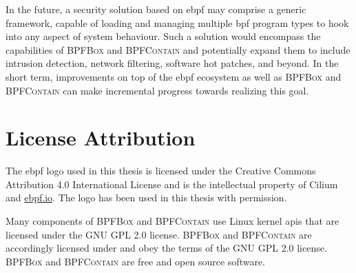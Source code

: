 \documentclass[
  fontsize=12pt,
  titlepage=firstiscover,
  paper=letter,
oneside,
  cleardoublepage=plain,
  parskip=half-,
  DIV=10,
  parindent,
  appendixprefix,
  chapterprefix,
  listof=totoc,
]{scrbook}
\newcommand{\bpfbox}{\textsc{BPFBox}}
\newcommand{\bpfcontain}{\textsc{BPFContain}}
\begin{document}
In the future, a security solution based on \gls{ebpf} may comprise a generic framework,
capable of loading and managing multiple \gls{bpf} program types to hook into any aspect
of system behaviour. Such a solution would encompass the capabilities of \bpfbox{} and
\bpfcontain{} and potentially expand them to include intrusion detection, network
filtering, software hot patches, and beyond. In the short term, improvements on top of the
\gls{ebpf} ecosystem as well as \bpfbox{} and \bpfcontain{} can make incremental progress
towards realizing this goal.



\cleardoublepage \printbibliography[heading=bibintoc]

\appendix \printglossary[type=\acronymtype, title=List of Acronyms, toctitle=List of Acronyms]

\chapter{License Attribution}

The \gls{ebpf} logo used in this thesis is licensed under the Creative Commons Attribution
4.0 International License and is the intellectual property of Cilium and \url{ebpf.io}.
The logo has been used in this thesis with permission.

Many components of \bpfbox{} and \bpfcontain{} use Linux kernel \glspl{api} that are
licensed under the GNU GPL 2.0 license. \bpfbox{} and \bpfcontain{} are accordingly
licensed under and obey the terms of the GNU GPL 2.0 license. \bpfbox{} and \bpfcontain{}
are free and open source software.
\end{document}
